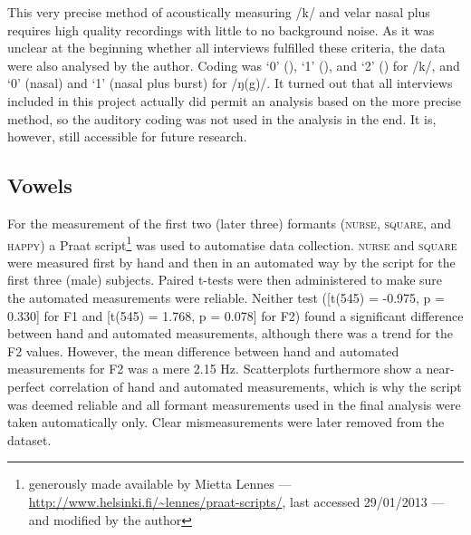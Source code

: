 This very precise method of acoustically measuring /k/ and velar nasal plus requires high quality recordings with little to no background noise.
As it was unclear at the beginning whether all interviews fulfilled these criteria, the data were also analysed  by the author. 
Coding was `0' (), `1' (), and `2' () for /k/, and `0' (nasal) and `1' (nasal plus burst) for /ŋ(g)/.
It turned out that all interviews included in this project actually did permit an analysis based on the more precise \citeauthor{sangster2001} method, so the auditory coding was not used in the analysis in the end.
It is, however, still accessible for future research.

		\subsection{Vowels}\label{sec.prod_method.vow}
		
For the measurement of the first two (later three)  formants (\textsc{nurse}, \textsc{square}, and \textsc{happy}) a Praat script\footnote{generously made available by Mietta Lennes --- \url{http://www.helsinki.fi/~lennes/praat-scripts/}, last accessed 29/01/2013 --- and modified by the author} was used to automatise data collection.
\textsc{nurse} and \textsc{square} were measured first by hand and then in an automated way by the script for the first three (male) subjects.
Paired t-tests were then administered to make sure the automated measurements were reliable. Neither test ([t(545) = -0.975, p = 0.330] for F1 and [t(545) = 1.768, p = 0.078] for F2) found a significant difference between hand and automated measurements, although there was a trend for the F2 values.
However, the mean difference between hand and automated measurements for F2 was a mere 2.15 Hz.
Scatterplots furthermore show a near-perfect correlation of hand and automated measurements, which is why the script was deemed reliable and all formant measurements used in the final analysis were taken automatically only.
Clear mismeasurements were later removed from the dataset.

